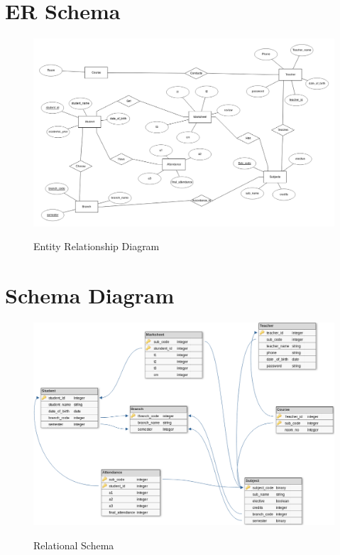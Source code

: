 \thispagestyle{fancy}

\section{ER Schema}
\begin{figure}[H]
\centering
\caption{Entity Relationship Diagram}
\includegraphics[scale=.35]{./erd.png}
\\[0.2in]
\label{fig:Entitiy Relationship Diagram}
\end{figure}

\pagebreak
\thispagestyle{fancy}

\section{Schema Diagram}
\begin{figure}[H]
\centering
\caption{Relational Schema}
\includegraphics[scale=.5]{./schema.png}
\\[0.2in]
\label{fig:Relational Schema}
\end{figure}

\thispagestyle{fancy}